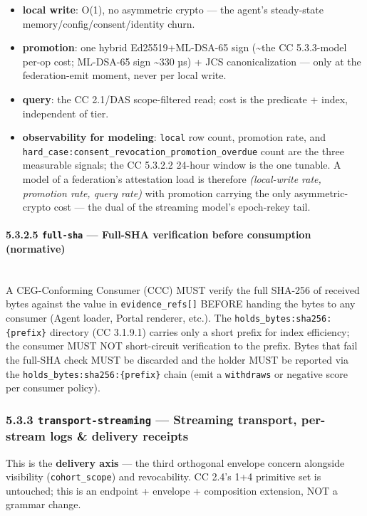 \documentclass[11pt]{article}
\begin{document}
\begin{itemize}\setlength\itemsep{0pt}
\item \textbf{local write}: O(1), no asymmetric crypto — the agent's steady-state memory/config/consent/identity churn.
\item \textbf{promotion}: one hybrid Ed25519+ML-DSA-65 sign (\textasciitilde{}the CC 5.3.3-model per-op cost; ML-DSA-65 sign \textasciitilde{}330 µs) + JCS canonicalization — only at the federation-emit moment, never per local write.
\item \textbf{query}: the CC 2.1/DAS scope-filtered read; cost is the predicate + index, independent of tier.
\item \textbf{observability for modeling}: \texttt{local} row count, promotion rate, and \texttt{hard\_case:consent\_revocation\_promotion\_overdue} count are the three measurable signals; the CC 5.3.2.2 24-hour window is the one tunable. A model of a federation's attestation load is therefore \textit{(local-write rate, promotion rate, query rate)} with promotion carrying the only asymmetric-crypto cost — the dual of the streaming model's epoch-rekey tail.
\end{itemize}


\paragraph{5.3.2.5 \texttt{full-sha} — Full-SHA verification before consumption (normative)}\mbox{}\\


A CEG-Conforming Consumer (CCC) MUST verify the full SHA-256 of received bytes against the value in \texttt{evidence\_refs[]} BEFORE handing the bytes to any consumer (Agent loader, Portal renderer, etc.). The \texttt{holds\_bytes:sha256:\{prefix\}} directory (CC 3.1.9.1) carries only a short prefix for index efficiency; the consumer MUST NOT short-circuit verification to the prefix. Bytes that fail the full-SHA check MUST be discarded and the holder MUST be reported via the \texttt{holds\_bytes:sha256:\{prefix\}} chain (emit a \texttt{withdraws} or negative score per consumer policy).


\subsubsection*{5.3.3 \texttt{transport-streaming} — Streaming transport, per-stream logs \& delivery receipts}


This is the \textbf{delivery axis} — the third orthogonal envelope concern alongside visibility (\texttt{cohort\_scope}) and revocability. CC 2.4's 1+4 primitive set is untouched; this is an endpoint + envelope + composition extension, NOT a grammar change.
\end{document}
